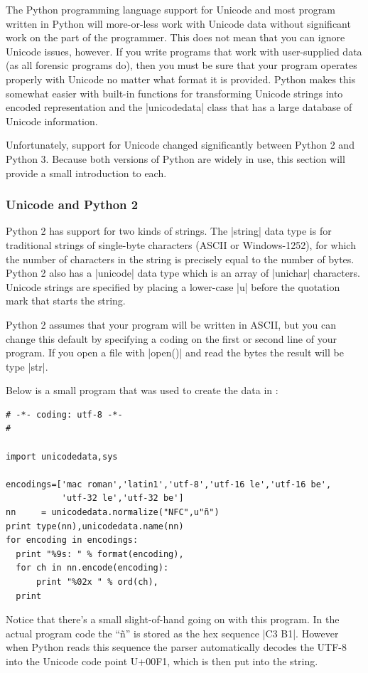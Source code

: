 The Python programming language  support for Unicode and most program written in Python will more-or-less work with Unicode data without significant work on the part of the programmer. This does not mean that you can ignore Unicode issues, however. If you write programs that work with user-supplied data (as all forensic programs do), then you must be sure that your program operates properly with Unicode no matter what format it is provided. Python makes this somewhat easier with built-in functions for transforming Unicode strings into encoded representation and the |unicodedata| class that has a large database of Unicode information.

Unfortunately, support for Unicode changed significantly between Python 2 and Python 3. Because both versions of Python are widely in use, this section will provide a small introduction to each.

\subsubsection{Unicode and Python 2}
Python 2 has support for two kinds of strings. The |string| data type is for traditional strings of single-byte characters (ASCII or Windows-1252), for which the number of characters in the string is precisely equal to the number of bytes. Python 2 also has a |unicode| data type which is an array of |unichar| characters. Unicode strings are specified by placing a lower-case |u| before the quotation mark that starts the string.

Python 2 assumes that your program will be written in ASCII, but you can change this default by specifying a coding on the first or second line of your program. If you open a file with |open()| and read the bytes the result will be type |str|.

Below is a small program that was used to create the data in :

\begin{Verbatim}
# -*- coding: utf-8 -*-
#

import unicodedata,sys

encodings=['mac roman','latin1','utf-8','utf-16 le','utf-16 be',
           'utf-32 le','utf-32 be']
nn     = unicodedata.normalize("NFC",u"ñ")
print type(nn),unicodedata.name(nn)
for encoding in encodings:
  print "%9s: " % format(encoding),
  for ch in nn.encode(encoding):
      print "%02x " % ord(ch),
  print
\end{Verbatim}

Notice that there's a small slight-of-hand going on with this
program. In the actual program code the ``ñ'' is stored as the hex
sequence |C3 B1|. However when Python reads this sequence the parser
automatically decodes the UTF-8 into the Unicode code point U+00F1,
which is then put into the string. 

